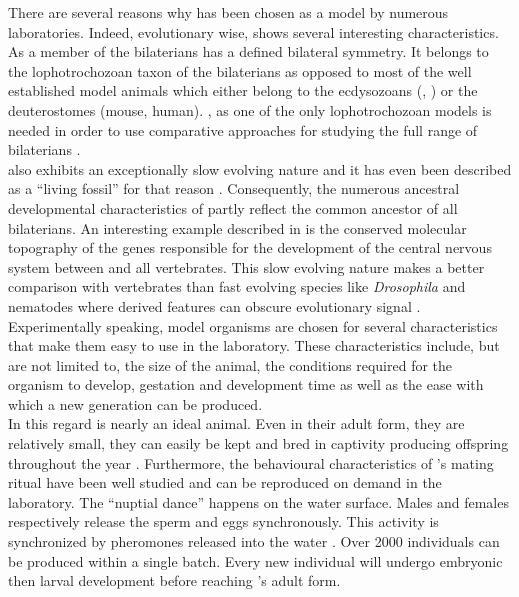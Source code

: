      There are several reasons why \platy{} has been chosen as a model by numerous laboratories. Indeed, evolutionary wise, \platy{} shows several interesting characteristics.  As a member of the bilaterians \platy{} has a defined bilateral symmetry. It belongs to the lophotrochozoan taxon of the bilaterians as opposed to most of the well established model animals which either belong to the ecdysozoans (, ) or the deuterostomes (mouse, human). \platy{}, as one of the only lophotrochozoan models is needed in order to use comparative approaches for studying the full range of bilaterians \citep{Fischer10}.\\
     
     \platy{} also exhibits an exceptionally slow evolving nature and it has even been described as a ``living fossil'' for that reason \citep{Fischer10}. Consequently, the numerous ancestral developmental characteristics of \platy{} partly reflect the common ancestor of all bilaterians. An interesting example described in \citep{denes07,tessmar07} is the conserved molecular topography of the genes responsible for the development of the central nervous system between \platy{} and all vertebrates. This slow evolving nature makes \platy{} a better comparison with vertebrates than fast evolving species like \emph{Drosophila} and nematodes where derived features can obscure evolutionary signal \citep{Fischer10,arendt124}.\\
     
     Experimentally speaking, model organisms are chosen for several characteristics that make them easy to use in the laboratory. These characteristics include, but are not limited to, the size of the animal, the conditions required for the organism to develop, gestation and development time as well as the ease with which a new generation can be produced.\\
     
     In this regard \platy{} is nearly an ideal animal. Even in their adult form, they are relatively small, they can easily be kept and bred in captivity producing offspring throughout the year \citep{fischer04}. Furthermore, the behavioural characteristics of \platy{}'s mating ritual have been well studied and can be reproduced on demand in the laboratory. The ``nuptial dance'' happens on the water surface. Males and females respectively release the sperm and eggs synchronously. This activity is synchronized by pheromones released into the water \citep{zeeck98}. Over 2000 individuals can be produced within a single batch. Every new individual will undergo embryonic then larval development before reaching \platy{}'s adult form.\\

